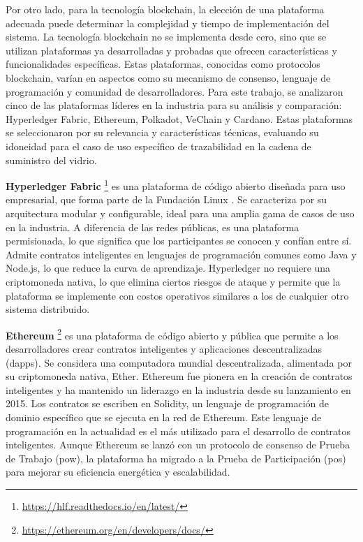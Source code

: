 Por otro lado, para la tecnología blockchain, la elección de una plataforma adecuada puede determinar la complejidad y tiempo de implementación del sistema.  La tecnología blockchain no se implementa desde cero, sino que se utilizan plataformas ya desarrolladas y probadas que ofrecen características y funcionalidades específicas. Estas plataformas, conocidas como protocolos blockchain, varían en aspectos como su mecanismo de consenso, lenguaje de programación y comunidad de desarrolladores. Para este trabajo, se analizaron cinco de las plataformas líderes en la industria para su análisis y comparación: Hyperledger Fabric, Ethereum, Polkadot, VeChain y Cardano. Estas plataformas se seleccionaron por su relevancia y características técnicas, evaluando su idoneidad para el caso de uso específico de trazabilidad en la cadena de suministro del vidrio.

\textbf{Hyperledger Fabric} \footnote{\url{https://hlf.readthedocs.io/en/latest/}}
es una plataforma de código abierto diseñada para uso empresarial, que forma parte de la Fundación Linux \cite{androulaki2018hyperledger}. Se caracteriza por su arquitectura modular y configurable, ideal para una amplia gama de casos de uso en la industria. A diferencia de las redes públicas, es una plataforma permisionada, lo que significa que los participantes se conocen y confían entre sí. Admite contratos inteligentes en lenguajes de programación comunes como Java y Node.js, lo que reduce la curva de aprendizaje. Hyperledger no requiere una criptomoneda nativa, lo que elimina ciertos riesgos de ataque y permite que la plataforma se implemente con costos operativos similares a los de cualquier otro sistema distribuido.

\textbf{Ethereum} \footnote{\url{https://ethereum.org/en/developers/docs/}}
es una plataforma de código abierto y pública que permite a los desarrolladores crear contratos inteligentes y aplicaciones descentralizadas (\acrshort{dapps}). Se considera una computadora mundial descentralizada, alimentada por su criptomoneda nativa, Ether. Ethereum fue pionera en la creación de contratos inteligentes y ha mantenido un liderazgo en la industria desde su lanzamiento en 2015. Los contratos se escriben en Solidity, un lenguaje de programación de dominio específico que se ejecuta en la red de Ethereum. Este lenguaje de programación en la actualidad es el más utilizado para el desarrollo de contratos inteligentes. Aunque Ethereum se lanzó con un protocolo de consenso de Prueba de Trabajo (\acrshort{pow}), la plataforma ha migrado a la Prueba de Participación (\acrshort{pos}) para mejorar su eficiencia energética y escalabilidad.


